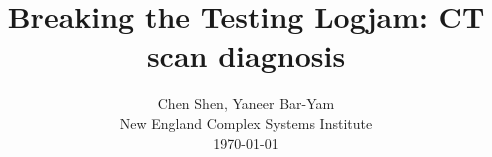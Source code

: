 \documentclass[onecolumn,journal]{IEEEtran}
\begin{document}
\title{\color{Brown} Breaking the Testing Logjam: CT scan diagnosis \\
\vspace{-0.35ex}}
\author{Chen Shen, Yaneer Bar-Yam \\ New England Complex Systems Institute \\
 \today 
  \vspace{-14ex} \\ 

   
\bigskip
\bigskip

\textbf{}
 }
    
\maketitle


\flushbottom %



\thispagestyle{empty} %




\renewcommand{\thefootnote}{\fnsymbol{footnote}}
\end{document}
